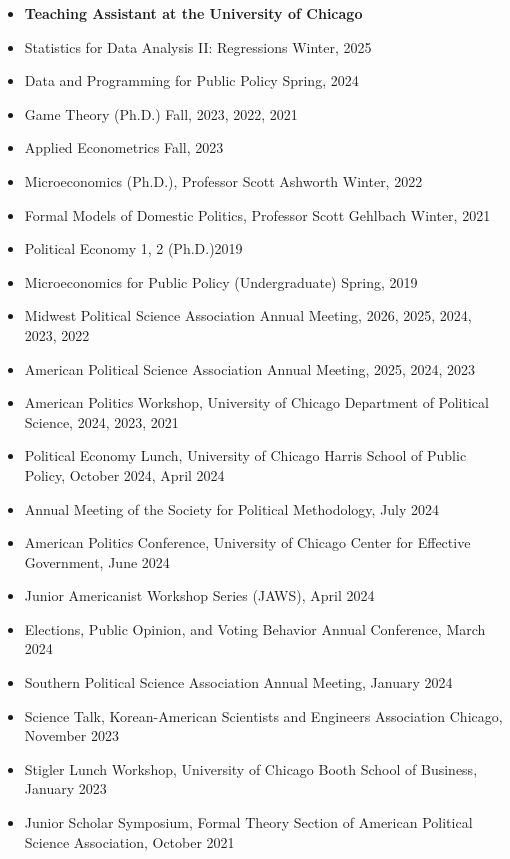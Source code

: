 \documentclass[11pt, Letter]{article}
\begin{document}
\begin{itemize}[leftmargin=47pt,itemindent=-21pt]
    \item[] \textbf{Teaching Assistant at the University of Chicago}
    \item[] Statistics for Data Analysis II: Regressions \hfill Winter, 2025
    \item[] Data and Programming for Public Policy \hfill Spring, 2024
    \item[] Game Theory (Ph.D.) \hfill Fall, 2023, 2022, 2021
    \item[] Applied Econometrics \hfill Fall, 2023
    \item[] Microeconomics (Ph.D.), Professor Scott Ashworth \hfill Winter, 2022
    \item[] Formal Models of Domestic Politics, Professor Scott Gehlbach \hfill Winter, 2021
    \item[] Political Economy 1, 2 (Ph.D.)\hfill 2019
    \item[] Microeconomics for Public Policy (Undergraduate) \hfill Spring, 2019
\end{itemize}


\vspace{3mm}


\begin{itemize}[leftmargin=47pt,itemindent=-21pt]
    \item[] Midwest Political Science Association Annual Meeting, 2026, 2025, 2024, 2023, 2022
    \item[] American Political Science Association Annual Meeting, 2025, 2024, 2023
    \item[] American Politics Workshop, University of Chicago Department of Political Science, 2024, 2023, 2021
    \item[] Political Economy Lunch, University of Chicago Harris School of Public Policy, October 2024, April 2024
    \item[] Annual Meeting of the Society for Political Methodology, July 2024
    \item[] American Politics Conference, University of Chicago Center for Effective Government, June 2024
    \item[] Junior Americanist Workshop Series (JAWS), April 2024
    \item[] Elections, Public Opinion, and Voting Behavior Annual Conference, March 2024
    \item[] Southern Political Science Association Annual Meeting, January 2024
    \item[] Science Talk, Korean-American Scientists and Engineers Association Chicago, November 2023
    \item[] Stigler Lunch Workshop, University of Chicago Booth School of Business, January 2023
    \item[] Junior Scholar Symposium, Formal Theory Section of American Political Science Association, October 2021
\end{itemize}
\end{document}
